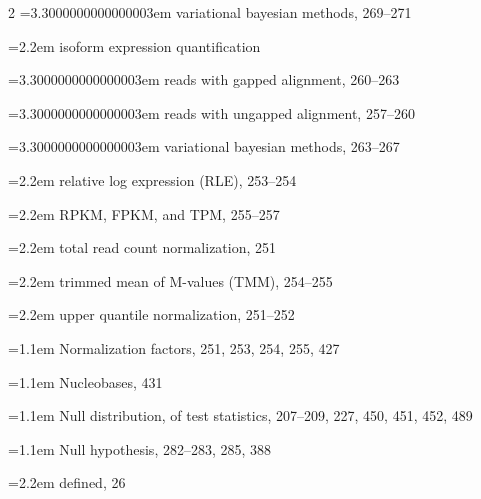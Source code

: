 \begin{multicols}{2}
\noindent\hangindent=3.3000000000000003em \hspace*{2.2em}variational bayesian methods, 269--271\par
\noindent\hangindent=2.2em \hspace*{1.1em}isoform expression quantification\par
\noindent\hangindent=3.3000000000000003em \hspace*{2.2em}reads with gapped alignment, 260--263\par
\noindent\hangindent=3.3000000000000003em \hspace*{2.2em}reads with ungapped alignment, 257--260\par
\noindent\hangindent=3.3000000000000003em \hspace*{2.2em}variational bayesian methods, 263--267\par
\noindent\hangindent=2.2em \hspace*{1.1em}relative log expression (RLE), 253--254\par
\noindent\hangindent=2.2em \hspace*{1.1em}RPKM, FPKM, and TPM, 255--257\par
\noindent\hangindent=2.2em \hspace*{1.1em}total read count normalization, 251\par
\noindent\hangindent=2.2em \hspace*{1.1em}trimmed mean of M-values (TMM), 254--255\par
\noindent\hangindent=2.2em \hspace*{1.1em}upper quantile normalization, 251--252\par
\noindent\hangindent=1.1em Normalization factors, 251, 253, 254, 255, 427\par
\noindent\hangindent=1.1em Nucleobases, 431\par
\noindent\hangindent=1.1em Null distribution, of test statistics, 207--209, 227, 450, 451, 452, 489\par
\noindent\hangindent=1.1em Null hypothesis, 282--283, 285, 388\par
\noindent\hangindent=2.2em \hspace*{1.1em}defined, 26\par


\end{multicols}
